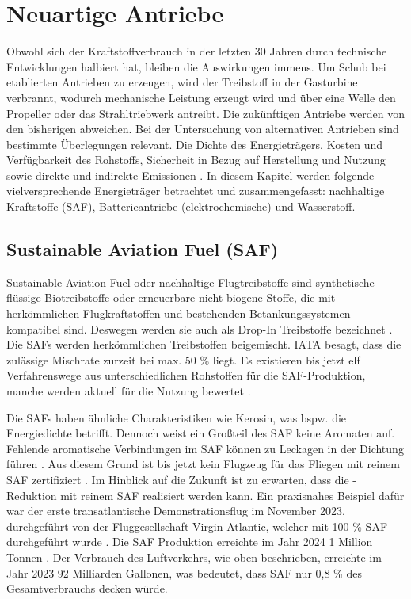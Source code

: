 
\section{Neuartige Antriebe}
\label{s:Neuartige Antriebe}
Obwohl sich der Kraftstoffverbrauch in der letzten 30 Jahren durch technische Entwicklungen halbiert \cite{mensen2013handbuch} hat, bleiben die Auswirkungen immens.
Um Schub bei etablierten Antrieben zu erzeugen, wird der Treibstoff in der Gasturbine verbrannt, 
wodurch mechanische Leistung erzeugt wird und über eine Welle den 
Propeller oder das Strahltriebwerk antreibt. 
%
Die zukünftigen Antriebe werden von den bisherigen abweichen.
Bei der Untersuchung von alternativen Antrieben sind bestimmte Überlegungen relevant. 
Die Dichte des Energieträgers, Kosten und Verfügbarkeit des Rohstoffs, Sicherheit in Bezug auf Herstellung 
und Nutzung sowie direkte und indirekte  Emissionen \cite{ansell2023review}.
%
%
In diesem Kapitel werden folgende vielversprechende Energieträger betrachtet und zusammengefasst: 
nachhaltige Kraftstoffe (SAF), Batterieantriebe (elektrochemische) und Wasserstoff.
%
\subsection{Sustainable Aviation Fuel (SAF)}

Sustainable Aviation Fuel oder nachhaltige Flugtreibstoffe sind synthetische flüssige Biotreibstoffe oder erneuerbare nicht biogene Stoffe, %
die mit herkömmlichen Flugkraftstoffen und bestehenden Betankungssystemen kompatibel sind.
Deswegen werden sie auch als Drop-In Treibstoffe bezeichnet \cite{iata_saf_2024}. 
Die SAFs werden herkömmlichen Treibstoffen beigemischt. IATA besagt, dass die zulässige Mischrate 
zurzeit bei max. 50 \% liegt. Es existieren bis jetzt elf Verfahrenswege aus unterschiedlichen Rohstoffen für die SAF-Produktion,
manche werden aktuell für die Nutzung bewertet \cite{icao_saf_conversion_2024}.

Die SAFs haben ähnliche Charakteristiken wie Kerosin, was bspw. die Energiedichte betrifft. 
Dennoch weist ein Großteil des SAF keine Aromaten auf.
Fehlende aromatische Verbindungen im SAF können zu Leckagen in der Dichtung führen \cite{jarin2024emissions}. 
Aus diesem Grund ist bis jetzt kein Flugzeug für das Fliegen mit reinem SAF zertifiziert \cite{iata_saf_2024}.
%
Im Hinblick auf die Zukunft ist zu erwarten, dass die -Reduktion mit reinem SAF realisiert werden kann.
Ein praxisnahes Beispiel dafür war der erste transatlantische Demonstrationsflug im November 2023, 
durchgeführt von der Fluggesellschaft Virgin Atlantic, welcher mit 100 \% SAF durchgeführt wurde \cite{virginatlantic_saf_2023}. 
Die SAF Produktion erreichte im Jahr 2024 1 Million Tonnen \cite{iata2024}. 
Der Verbrauch des Luftverkehrs, wie oben beschrieben, erreichte im Jahr 2023 92 Milliarden Gallonen, 
was bedeutet, dass SAF nur 0,8 \% des Gesamtverbrauchs decken würde.

